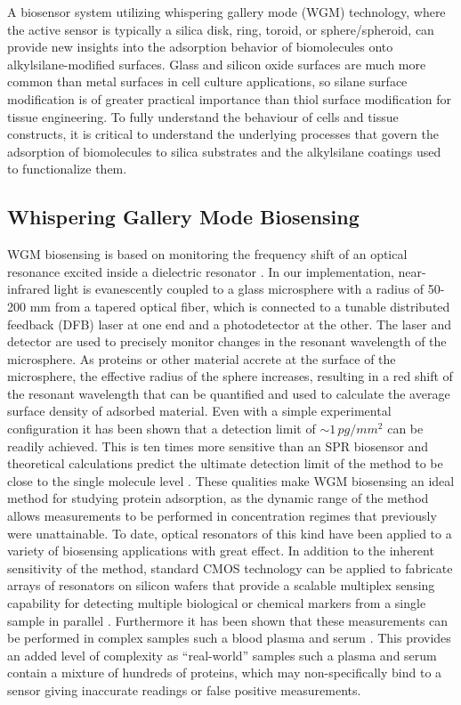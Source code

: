 A biosensor system utilizing whispering gallery mode (WGM) technology,
where the active sensor is typically a silica disk, ring, toroid,
or sphere/spheroid, can provide new insights into the adsorption behavior
of biomolecules onto alkylsilane-modified surfaces. Glass and silicon
oxide surfaces are much more common than metal surfaces in cell culture
applications, so silane surface modification is of greater practical
importance than thiol surface modification for tissue engineering.
To fully understand the behaviour of cells and tissue constructs,
it is critical to understand the underlying processes that govern
the adsorption of biomolecules to silica substrates and the alkylsilane
coatings used to functionalize them.


\subsection{Whispering Gallery Mode Biosensing}

WGM biosensing is based on monitoring the frequency shift of an optical
resonance excited inside a dielectric resonator \cite{Vollmer2005,Vollmer2002}.
In our implementation, near-infrared light is evanescently coupled
to a glass microsphere with a radius of 50-200 \textgreek{m}m from
a tapered optical fiber, which is connected to a tunable distributed
feedback (DFB) laser at one end and a photodetector at the other.
The laser and detector are used to precisely monitor changes in the
resonant wavelength of the microsphere. As proteins or other material
accrete at the surface of the microsphere, the effective radius of
the sphere increases, resulting in a red shift of the resonant wavelength
that can be quantified and used to calculate the average surface density
of adsorbed material. Even with a simple experimental configuration
\cite{Vollmer2002} it has been shown that a detection limit of $\sim1\, pg/mm^{2}$
can be readily achieved. This is ten times more sensitive than an
SPR biosensor and theoretical calculations predict the ultimate detection
limit of the method to be close to the single molecule level \cite{Armani2003,Vollmer2008,Vollmer2008a,Arnold2003}.
These qualities make WGM biosensing an ideal method for studying protein
adsorption, as the dynamic range of the method allows measurements
to be performed in concentration regimes that previously were unattainable.
To date, optical resonators of this kind have been applied to a variety
of biosensing applications with great effect. In addition to the inherent
sensitivity of the method, standard CMOS technology can be applied
to fabricate arrays of resonators on silicon wafers that provide a
scalable multiplex sensing capability for detecting multiple biological
or chemical markers from a single sample in parallel \cite{Luchansky2010,Washburn2009}.
Furthermore it has been shown that these measurements can be performed
in complex samples such a blood plasma and serum \cite{Luchansky2011}.
This provides an added level of complexity as {}``real-world'' samples
such a plasma and serum contain a mixture of hundreds of proteins,
which may non-specifically bind to a sensor giving inaccurate readings
or false positive measurements. 


